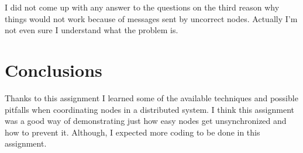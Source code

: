 \documentclass[a4paper, 11pt]{article}
\begin{document}
I did not come up with any answer to the questions on the third reason why things would not work because of messages sent by uncorrect nodes. Actually I'm not even sure I understand what the problem is.

\section{Conclusions}

Thanks to this assignment I learned some of the available techniques and possible pitfalls when coordinating nodes in a distributed system. I think this assignment was a good way of demonstrating just how easy nodes get unsynchronized and how to prevent it. Although, I expected more coding to be done in this assignment.
\end{document}
